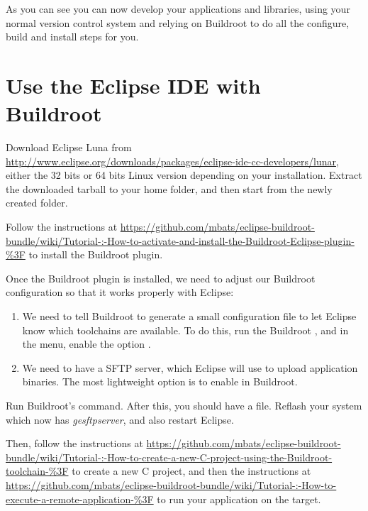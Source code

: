 As you can see you can now develop your applications and libraries,
using your normal version control system and relying on Buildroot to
do all the configure, build and install steps for you.

\section{Use the Eclipse IDE with Buildroot}

Download Eclipse Luna from
\url{http://www.eclipse.org/downloads/packages/eclipse-ide-cc-developers/lunar},
either the 32 bits or 64 bits Linux version depending on your
installation. Extract the downloaded tarball to your home folder, and
then start  from the newly created 
folder.

Follow the instructions at
\url{https://github.com/mbats/eclipse-buildroot-bundle/wiki/Tutorial-:-How-to-activate-and-install-the-Buildroot-Eclipse-plugin-%3F}
to install the Buildroot plugin.

Once the Buildroot plugin is installed, we need to adjust our Buildroot configuration so that it works properly with Eclipse:

\begin{enumerate}

\item We need to tell Buildroot to generate a small configuration file
  to let Eclipse know which toolchains are available. To do this, run
  the Buildroot , and in the  menu,
  enable the option .

\item We need to have a SFTP server, which Eclipse will use to upload
  application binaries. The most lightweight option is to enable
   in Buildroot.

\end{enumerate}

Run Buildroot's  command. After this, you should have a
 file. Reflash your system
which now has {\em gesftpserver}, and also restart Eclipse.

Then, follow the instructions at
\url{https://github.com/mbats/eclipse-buildroot-bundle/wiki/Tutorial-:-How-to-create-a-new-C-project-using-the-Buildroot-toolchain-%3F}
to create a new C project, and then the instructions at
\url{https://github.com/mbats/eclipse-buildroot-bundle/wiki/Tutorial-:-How-to-execute-a-remote-application-%3F}
to run your application on the target.
